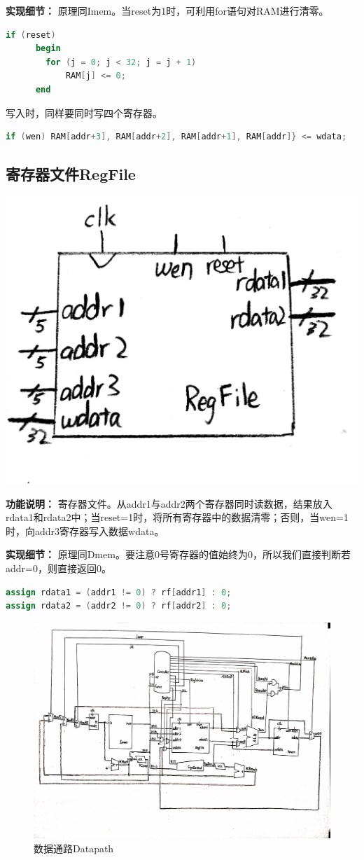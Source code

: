 \documentclass[twocolumn]{article} %
\begin{document}
\begin{sloppypar}
{\bf 实现细节：} 原理同Imem。当reset为1时，可利用for语句对RAM进行清零。
\begin{lstlisting}[language=Verilog]  
if (reset)
      begin
        for (j = 0; j < 32; j = j + 1) 
            RAM[j] <= 0;
      end
\end{lstlisting}  
写入时，同样要同时写四个寄存器。
\begin{lstlisting}[language=Verilog]  
if (wen) RAM[addr+3], RAM[addr+2], RAM[addr+1], RAM[addr]} <= wdata;
\end{lstlisting} 

\subsection{寄存器文件RegFile}

\includegraphics[width =0.3 \linewidth]{figure/Regfile.jpg}

{\bf 功能说明：} 寄存器文件。从addr1与addr2两个寄存器同时读数据，结果放入rdata1和rdata2中；当reset=1时，将所有寄存器中的数据清零；否则，当wen=1时，向addr3寄存器写入数据wdata。

{\bf 实现细节：} 原理同Dmem。要注意0号寄存器的值始终为0，所以我们直接判断若addr=0，则直接返回0。
\begin{lstlisting}[language=Verilog]  
assign rdata1 = (addr1 != 0) ? rf[addr1] : 0;
assign rdata2 = (addr2 != 0) ? rf[addr2] : 0;
\end{lstlisting} 

\begin{figure}[htbp]
\centering
\includegraphics[width = 0.8\linewidth]{figure/datapath.jpg}
\caption{数据通路Datapath}
\label{fig:datapath}
\end{figure}


\end{sloppypar}
\end{document}
